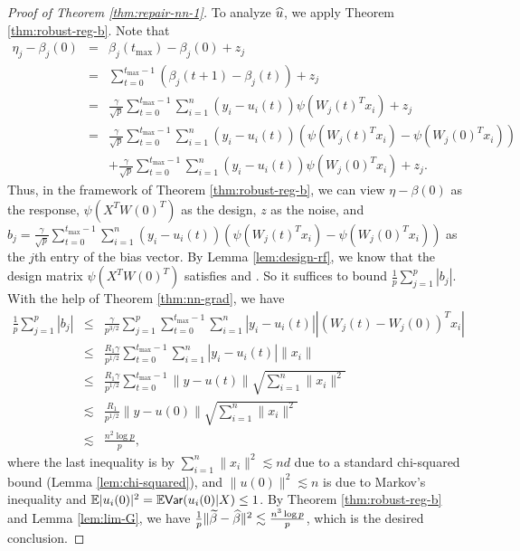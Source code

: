 \begin{proof}[Proof of Theorem \ref{thm:repair-nn-1}]
To analyze $\widehat{u}$, we apply Theorem \ref{thm:robust-reg-b}. Note that
\begin{eqnarray*}
\eta_j - \beta_j(0) &=& \beta_j(t_{\max}) - \beta_j(0) +z_j \\
&=& \sum_{t=0}^{t_{\max}-1}\left(\beta_j(t+1)-\beta_j(t)\right) + z_j \\
&=& \frac{\gamma}{\sqrt{p}}\sum_{t=0}^{t_{\max}-1}\sum_{i=1}^n(y_i-u_i(t))\psi(W_j(t)^Tx_i) + z_j \\
&=& \frac{\gamma}{\sqrt{p}}\sum_{t=0}^{t_{\max}-1}\sum_{i=1}^n(y_i-u_i(t))(\psi(W_j(t)^Tx_i)-\psi(W_j(0)^Tx_i)) \\
&& + \frac{\gamma}{\sqrt{p}}\sum_{t=0}^{t_{\max}-1}\sum_{i=1}^n(y_i-u_i(t))\psi(W_j(0)^Tx_i) + z_j.
\end{eqnarray*}
Thus, in the framework of Theorem \ref{thm:robust-reg-b}, we can view $\eta-\beta(0)$ as the response, $\psi(X^TW(0)^T)$ as the design, $z$ as the noise, and $b_j=\frac{\gamma}{\sqrt{p}}\sum_{t=0}^{t_{\max}-1}\sum_{i=1}^n(y_i-u_i(t))(\psi(W_j(t)^Tx_i)-\psi(W_j(0)^Tx_i))$ as the $j$th entry of the bias vector. By Lemma \ref{lem:design-rf}, we know that the design matrix $\psi(X^TW(0)^T)$ satisfies \conditionA{} and \conditionB. So it suffices to bound $\frac{1}{p}\sum_{j=1}^p|b_j|$. With the help of Theorem \ref{thm:nn-grad}, we have
\begin{eqnarray*}
\frac{1}{p}\sum_{j=1}^p|b_j| &\leq& \frac{\gamma}{p^{3/2}}\sum_{j=1}^p\sum_{t=0}^{t_{\max}-1}\sum_{i=1}^n|y_i-u_i(t)||(W_j(t)-W_j(0))^Tx_i| \\
&\leq& \frac{R_1\gamma}{p^{1/2}}\sum_{t=0}^{t_{\max}-1}\sum_{i=1}^n|y_i-u_i(t)|\|x_i\| \\
&\leq& \frac{R_1\gamma}{p^{1/2}}\sum_{t=0}^{t_{\max}-1}\|y-u(t)\|\sqrt{\sum_{i=1}^n\|x_i\|^2} \\
&\lesssim& \frac{R_1}{p^{1/2}}\|y-u(0)\|\sqrt{\sum_{i=1}^n\|x_i\|^2} \\
&\lesssim& \frac{n^2\log p}{p},
\end{eqnarray*}
where the last inequality is by $\sum_{i=1}^n\|x_i\|^2\lesssim nd$ due to a standard chi-squared bound (Lemma \ref{lem:chi-squared}), and $\|u(0)\|^2\lesssim n$ is due to Markov's inequality and $\mathbb{E}|u_i(0)|^2 = \mathbb{E}\textsf{Var}(u_i(0)|X) \leq 1$. By Theorem \ref{thm:robust-reg-b} and Lemma \ref{lem:lim-G}, we have $\frac{1}{p}\|\widetilde{\beta}-\widehat{\beta}\|^2 \lesssim \frac{n^3\log p}{p}$, which is the desired conclusion.
\end{proof}

